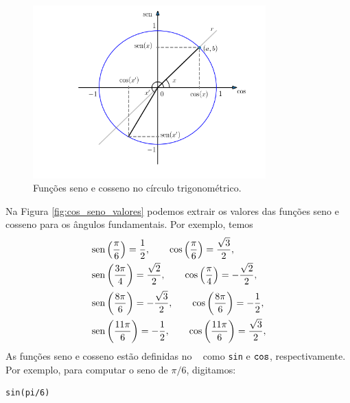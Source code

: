 \begin{figure}[H]
  \centering
  \includegraphics[width=0.8\textwidth]{./cap_funcao/dados/fig_cos_seno/fig_cos_seno}
  \caption{Funções seno e cosseno no círculo trigonométrico.}
  \label{fig:cos_seno}
\end{figure}

Na Figura \ref{fig:cos_seno_valores} podemos extrair os valores das funções seno e cosseno para os ângulos fundamentais. Por exemplo, temos
\begin{align}
  &\operatorname{sen}\left(\frac{\pi}{6}\right) = \frac{1}{2},\qquad \cos\left(\frac{\pi}{6}\right) = \frac{\sqrt{3}}{2},\\
  &\operatorname{sen}\left(\frac{3\pi}{4}\right) = \frac{\sqrt{2}}{2},\qquad \cos\left(\frac{\pi}{4}\right) = -\frac{\sqrt{2}}{2},\\
  &\operatorname{sen}\left(\frac{8\pi}{6}\right) = -\frac{\sqrt{3}}{2},\qquad \cos\left(\frac{8\pi}{6}\right) = -\frac{1}{2},\\
  &\operatorname{sen}\left(\frac{11\pi}{6}\right) = -\frac{1}{2},\qquad \cos\left(\frac{11\pi}{6}\right) = \frac{\sqrt{3}}{2},\\
\end{align}
\ifispython
As funções seno e cosseno estão definidas no \sympy~ como \verb+sin+ e $\verb+cos+$, respectivamente. Por exemplo, para computar o seno de $\pi/6$, digitamos:
\begin{verbatim}
sin(pi/6)
\end{verbatim}
\fi

